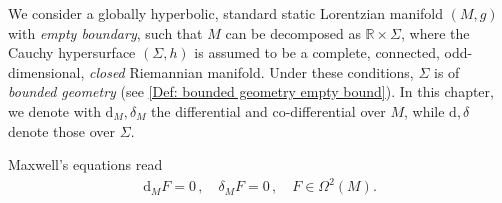 We consider a globally hyperbolic, standard static Lorentzian manifold $(M,g)$ with \emph{empty boundary}, such that $M$ can be decomposed as $\mathbb{R}\times\Sigma$, where the Cauchy hypersurface $(\Sigma,h)$ is assumed to be a complete, connected, odd-dimensional, \emph{closed} Riemannian manifold. Under these conditions, $\Sigma$ is of \emph{bounded geometry} (see \ref{Def: bounded geometry empty bound}).  In this chapter, we denote with $\mathrm{d}_M,\delta_M$ the differential and co-differential over $M$, while $\mathrm{d},\delta$ denote those over $\Sigma$.

\noindent Maxwell's equations read
\begin{align}\label{Eqn: covariant Maxwell's equations}
\mathrm{d}_MF=0\,,\quad\delta_M F=0\,,\quad  F\in\Omega^2(M).
\end{align}

